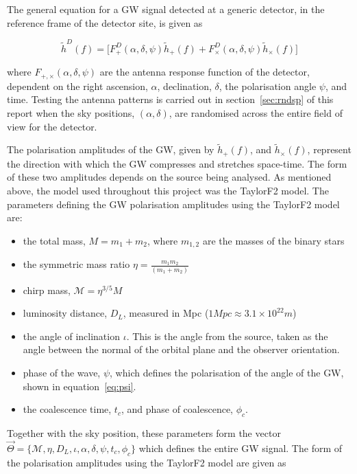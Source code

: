 \documentclass[12pt]{iopart}
\newcommand{\gws}{\tilde{h}}
\begin{document}
The general equation for a GW signal detected at a generic detector, in the
reference frame of the detector site, is given as~\cite{SathSchutz}

\begin{equation}
  \label{eq:gravsig}
   \gws^D(f) = \big[ F_{+}^D(\alpha, \delta, \psi)\gws_{+}(f) +
F_{\times}^D(\alpha, \delta, \psi)\gws_{\times}(f)\big]
\end{equation}

where $F_{+,\times}(\alpha, \delta, \psi)$ are the antenna response function of
the detector, dependent on the right ascension, $\alpha$, declination,
$\delta$, the polarisation angle $\psi$, and time. Testing the antenna patterns
is carried out in section~\ref{sec:rndsp} of this report when the sky
positions, $(\alpha, \delta)$, are randomised across the entire field of view
for the detector.

The polarisation amplitudes of the GW, given by $\gws_{+}(f)$, and
$\gws_{\times}(f)$, represent the direction with which the GW compresses and
stretches space-time. The form of these two amplitudes depends on the source
being analysed. As mentioned above, the model used throughout this project was
the TaylorF2 model. The parameters defining the GW polarisation amplitudes
using the TaylorF2 model are:

\begin{itemize}
\item the total mass, $M = m_{1}+m_{2}$, where $m_{1,2}$ are the masses of the
binary stars
\item the symmetric mass ratio $\eta = \frac{m_{1}m_{2}}{(m_{1}+m_{2})}$
\item chirp mass, $\mathcal{M} = \eta^{3/5}M$
\item luminosity distance, $D_{L}$, measured in Mpc ($1 Mpc \approx
3.1\times10^{22}m  $)
\item the angle of inclination $\iota$. This is the angle from the source,
taken as the angle between the normal of the orbital plane and the observer
orientation.
\item phase of the wave, $\psi$, which defines the polarisation of the angle of
the GW, shown in equation~\ref{eq:psi}.
\item the coalescence time, $t_c$, and phase of coalescence, $\phi_c$.
\end{itemize}

Together with the sky position, these parameters form the vector $\vec{\Theta}
= \{\mathcal{M}, \eta, D_{L}, \iota, \alpha, \delta, \psi, t_{c}, \phi_{c}\}$
which defines the entire GW signal.  The form of the polarisation amplitudes
using the TaylorF2 model are given as~\cite{SathSchutz,pN,TF2}
\end{document}
